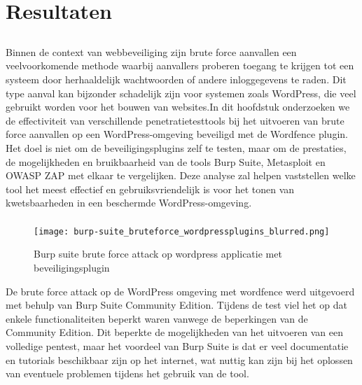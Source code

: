 
\chapter{Resultaten}%
\label{ch:resultaten}

\section{}
Binnen de context van webbeveiliging zijn brute force aanvallen een veelvoorkomende methode waarbij aanvallers proberen toegang te krijgen tot een systeem 
door herhaaldelijk wachtwoorden of andere inloggegevens te raden. Dit type aanval kan bijzonder schadelijk zijn voor systemen zoals WordPress, die veel 
gebruikt worden voor het bouwen van websites.In dit hoofdstuk onderzoeken we de effectiviteit van verschillende penetratietesttools bij het uitvoeren van 
brute force aanvallen op een WordPress-omgeving beveiligd met de Wordfence plugin. Het doel is niet om de beveiligingsplugins zelf te testen, maar om de 
prestaties, de mogelijkheden en bruikbaarheid van de tools Burp Suite, Metasploit en OWASP ZAP met elkaar te vergelijken. Deze analyse zal helpen vaststellen welke tool 
het meest effectief en gebruiksvriendelijk is voor het tonen van kwetsbaarheden in een beschermde WordPress-omgeving.

\subsection{}
\begin{figure}
    \centering
    \texttt{[image: burp-suite\_bruteforce\_wordpressplugins\_blurred.png]}
    \caption[Burp suite brute force attack op wordpress applicatie met beveiligingsplugin]{Burp suite brute force attack op wordpress applicatie met beveiligingsplugin}
\end{figure}
De brute force attack op de WordPress omgeving met wordfence werd uitgevoerd met behulp van Burp Suite Community Edition. Tijdens de test viel het 
op dat enkele functionaliteiten beperkt waren vanwege de beperkingen van de Community Edition. Dit beperkte de mogelijkheden van het uitvoeren van een volledige 
pentest, maar het voordeel van Burp Suite is dat er veel documentatie en tutorials beschikbaar zijn op het internet, wat nuttig kan zijn bij het oplossen van 
eventuele problemen tijdens het gebruik van de tool.

